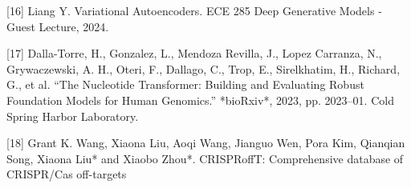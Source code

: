 \documentclass{article}
\begin{document}
\label{Reference 16} [16] Liang Y. Variational Autoencoders. ECE 285 Deep Generative Models - Guest Lecture, 2024.

\label{Reference 17} [17] Dalla-Torre, H., Gonzalez, L., Mendoza Revilla, J., Lopez Carranza, N., Grywaczewski, A. H., Oteri, F., Dallago, C., Trop, E., Sirelkhatim, H., Richard, G., et al. “The Nucleotide Transformer: Building and Evaluating Robust Foundation Models for Human Genomics.” *bioRxiv*, 2023, pp. 2023–01. Cold Spring Harbor Laboratory.

\label{Reference 18} [18] Grant K. Wang, Xiaona Liu, Aoqi Wang, Jianguo Wen, Pora Kim, Qianqian Song, Xiaona Liu* and Xiaobo Zhou*. CRISPRoffT: Comprehensive database of CRISPR/Cas off-targets
\end{document}
